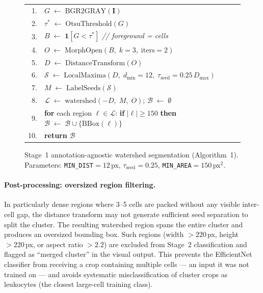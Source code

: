 \documentclass[10pt,twocolumn]{article}
\begin{document}
\begin{figure}[t]
{\begin{minipage}{0.92\linewidth}
\noindent
\begin{tabular}{@{\hspace{0.5em}}rl@{}}
1.  & $G \;\leftarrow\; \mathrm{BGR2GRAY}(\mathbf{I})$\\[3pt]
2.  & $\tau^* \;\leftarrow\; \mathrm{OtsuThreshold}(G)$\\[3pt]
3.  & $B \;\leftarrow\; \mathbf{1}[G < \tau^*]$ \quad \textit{// foreground = cells}\\[3pt]
4.  & $O \;\leftarrow\; \mathrm{MorphOpen}(B,\; k{=}3,\; \mathrm{iters}{=}2)$\\[3pt]
5.  & $D \;\leftarrow\; \mathrm{DistanceTransform}(O)$\\[3pt]
6.  & $\mathcal{S} \;\leftarrow\; \mathrm{LocalMaxima}(D,\; d_{\min}{=}12,\;
      \tau_{\mathrm{seed}}{=}0.25\,D_{\max})$\\[3pt]
7.  & $M \;\leftarrow\; \mathrm{LabelSeeds}(\mathcal{S})$\\[3pt]
8.  & $\mathcal{L} \;\leftarrow\; \mathrm{watershed}(-D,\; M,\; O)$;
      \quad $\mathcal{B} \;\leftarrow\; \emptyset$\\[3pt]
9.  & \textbf{for} each region $\ell \in \mathcal{L}$:
      \textbf{if} $|\ell| \geq 150$ \textbf{then}
      $\mathcal{B} \;\leftarrow\; \mathcal{B} \cup \{\mathrm{BBox}(\ell)\}$\\[3pt]
10. & \textbf{return} $\mathcal{B}$\\
\end{tabular}
\vspace{0.4em}
\end{minipage}}
\caption{Stage~1 annotation-agnostic watershed segmentation (Algorithm~1).
  Parameters: \texttt{MIN\_DIST}$\!=\!12$\,px, $\tau_{\mathrm{seed}}\!=\!0.25$,
  \texttt{MIN\_AREA}$\!=\!150$\,px$^2$.}
\label{fig:watershed_alg}
\end{figure}

\paragraph{Post-processing: oversized region filtering.}
In particularly dense regions where 3--5 cells are packed without any
visible inter-cell gap, the distance transform may not generate sufficient
seed separation to split the cluster. The resulting watershed region
spans the entire cluster and produces an oversized bounding box. Such
regions (width $> 220$\,px, height $> 220$\,px, or aspect ratio $> 2.2$)
are excluded from Stage~2 classification and flagged as ``merged cluster''
in the visual output. This prevents the EfficientNet classifier from
receiving a crop containing multiple cells --- an input it was not trained
on --- and avoids systematic misclassification of cluster crops as
leukocytes (the closest large-cell training class).
\end{document}
